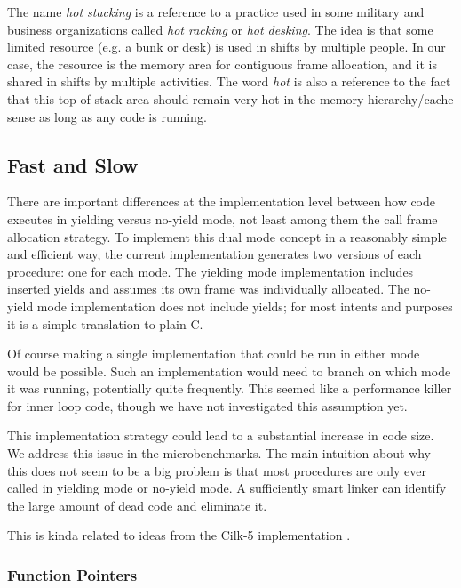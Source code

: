 \documentclass[10pt,preprint]{sigplanconf}
\begin{document}
The name \emph{hot stacking} is a reference to a practice used in some military and business organizations called \emph{hot racking} or \emph{hot desking}.
The idea is that some limited resource (e.g. a bunk or desk) is used in shifts by multiple people.
In our case, the resource is the memory area for contiguous frame allocation, and it is shared in shifts by multiple activities.
The word \emph{hot} is also a reference to the fact that this top of stack area should remain very hot in the memory hierarchy/cache sense as long as any code is running.

\subsection{Fast and Slow}

There are important differences at the implementation level between how code executes in yielding versus no-yield mode, not least among them the call frame allocation strategy.
To implement this dual mode concept in a reasonably simple and efficient way, the current \charcoal implementation generates two versions of each procedure: one for each mode.
The yielding mode implementation includes inserted yields and assumes its own frame was individually allocated.
The no-yield mode implementation does not include yields; for most intents and purposes it is a simple translation to plain C.

Of course making a single implementation that could be run in either mode would be possible.
Such an implementation would need to branch on which mode it was running, potentially quite frequently.
This seemed like a performance killer for inner loop code, though we have not investigated this assumption yet.

This implementation strategy could lead to a substantial increase in code size.
We address this issue in the microbenchmarks.
The main intuition about why this does not seem to be a big problem is that most procedures are only ever called in yielding mode or no-yield mode.
A sufficiently smart linker can identify the large amount of dead code and eliminate it.

This is kinda related to ideas from the Cilk-5 implementation
\cite{Frigo1998}.

\subsubsection{Function Pointers}
\end{document}
